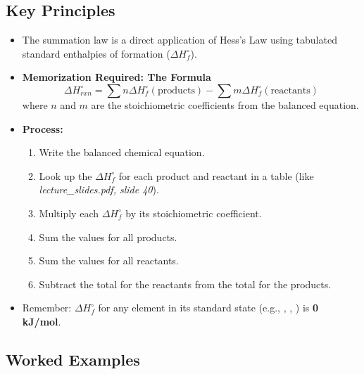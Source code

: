 \documentclass{article}
\begin{document}
\subsection{Key Principles}
\begin{itemize}
    \item The summation law is a direct application of Hess's Law using tabulated standard enthalpies of formation ($\Delta H_f^\circ$).
    \item \textbf{Memorization Required: The Formula}
    \[ \Delta H_{rxn}^\circ = \sum n\Delta H_f^\circ(\text{products}) - \sum m\Delta H_f^\circ(\text{reactants}) \]
    where $n$ and $m$ are the stoichiometric coefficients from the balanced equation.
    \item \textbf{Process:}
        \begin{enumerate}
            \item Write the balanced chemical equation.
            \item Look up the $\Delta H_f^\circ$ for each product and reactant in a table (like \textit{lecture\_slides.pdf, slide 40}).
            \item Multiply each $\Delta H_f^\circ$ by its stoichiometric coefficient.
            \item Sum the values for all products.
            \item Sum the values for all reactants.
            \item Subtract the total for the reactants from the total for the products.
        \end{enumerate}
    \item Remember: $\Delta H_f^\circ$ for any element in its standard state (e.g., , , ) is \textbf{0 kJ/mol}.
\end{itemize}

\subsection{Worked Examples}
\end{document}
